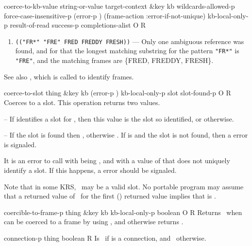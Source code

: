 \begin{okbcop}{coerce-to-kb-value}{ string-or-value target-context \&key kb wildcards-allowed-p force-case-insensitive-p (error-p \true) (frame-action :error-if-not-unique) kb-local-only-p} { result-of-read success-p completions-alist } { O } { R } {  }
\begin{enumerate}
  \item {\tt (("FR*" "FRE" FRED FREDDY FRESH))} --- Only one ambiguous
         reference was found, and for that the longest matching substring for
         the pattern {\tt "FR*"} is {\tt "FRE"}, and the matching frames
         are \{FRED, FREDDY, FRESH\}.
  \end{enumerate}
  See also , which is called to identify frames.
\end{okbcop}

\begin{okbcop}{coerce-to-slot}{ thing \&key kb (error-p \true) kb-local-only-p} { slot slot-found-p } { O } { R } {  }
Coerces  to a slot.  This operation returns two values.
   \bitem
   \item {} -- If  identifies a slot for ,
                           then this value is the slot so identified, or
                           \false otherwise.
   \item {} -- If the slot is found then \true,
                                   otherwise \false.
   \eitem
   If  is \true and the slot is not found, then a
    error is signaled.

   It is an error to call  with  being
   \true, and with a value of  that does not uniquely identify
   a slot.  If this happens, a  error should be
   signaled.

   Note that in some KRS, \false\ may be a valid slot.  No portable
   program may assume that a returned value of \false\ for the first
   () returned value implies that  is \false.
\end{okbcop}

\begin{okbcop}{coercible-to-frame-p}{ thing \&key kb kb-local-only-p} { boolean } { O } { R } {  }
Returns \true\ when  can be coerced to a frame
   by using , and otherwise returns \false.
\end{okbcop}

\begin{okbcfun}{connection-p}{ thing} { boolean } {   } { R } {  }
Is \true\ if  is a connection, and \false\ otherwise.
\end{okbcfun}

